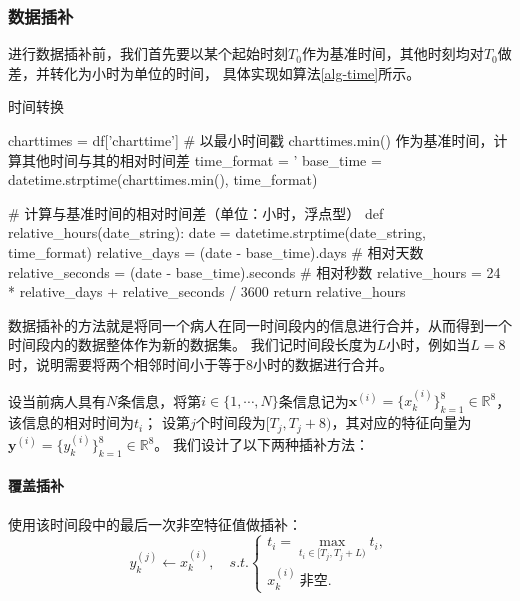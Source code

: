 \documentclass[12pt, a4paper, oneside]{ctexart}
\numberwithin{equation}{section}  %
\def\bd{\boldsymbol}        %
\def\R{\mathbb{R}}          %
\begin{document}
\subsubsection{数据插补}
进行数据插补前，我们首先要以某个起始时刻$T_0$作为基准时间，其他时刻均对$T_0$做差，并转化为小时为单位的时间，
具体实现如算法\ref{alg-time}所示。
\begin{algorithm}[H]
    \caption{时间转换}\label{alg-time}
    \begin{pythoncode}
charttimes = df['charttime']
# 以最小时间戳 charttimes.min() 作为基准时间，计算其他时间与其的相对时间差
time_format = '%
base_time = datetime.strptime(charttimes.min(), time_format)

# 计算与基准时间的相对时间差（单位：小时，浮点型）
def relative_hours(date_string): 
    date = datetime.strptime(date_string, time_format)
    relative_days = (date - base_time).days  # 相对天数
    relative_seconds = (date - base_time).seconds  # 相对秒数
    relative_hours = 24 * relative_days + relative_seconds / 3600
    return relative_hours
    \end{pythoncode}
\end{algorithm}
\vspace{-1em}
数据插补的方法就是将同一个病人在同一时间段内的信息进行合并，从而得到一个时间段内的数据整体作为新的数据集。
我们记时间段长度为$L$小时，例如当$L=8$时，说明需要将两个相邻时间小于等于$8$小时的数据进行合并。

设当前病人具有$N$条信息，将第$i\in\{1,\cdots,N\}$条信息记为$\bd{x}^{(i)} = \{x_k^{(i)}\}_{k=1}^8\in \R^8$，该信息的相对时间为$t_i$；
设第$j$个时间段为$[T_j,T_j+8)$，其对应的特征向量为$\bd{y}^{(i)} = \{y_k^{(i)}\}_{k=1}^8\in\R^8$。 我们设计了以下两种插补方法：
\paragraph{覆盖插补}使用该时间段中的最后一次非空特征值做插补：
\begin{equation}
    y_k^{(j)}\gets x_k^{(i)},\quad s.t.\begin{cases}
        t_i = \max_{t_i\in[T_j,T_j+L)}t_i,\\
        x_k^{(i)}\ \text{非空}.
    \end{cases}
\end{equation}
\end{document}
